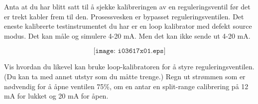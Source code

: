 

Anta at du har blitt satt til å sjekke kalibreringen av en reguleringsventil før det er trekt kabler frem til den. Prosessvesken er bypasset reguleringsventilen. Det eneste kalibrerte testinstrumentet du har er en loop kalibrator med defekt source modus. Det kan måle og simulere 4-20 mA. Men det kan ikke sende ut 4-20 mA.  


$$\texttt{[image: i03617x01.eps]}$$

Vis hvordan du likevel kan bruke loop-kalibratoren for å styre reguleringsventilen. (Du kan ta med annet utstyr som du måtte trenge.) Regn ut strømmen som er nødvendig for å åpne ventilen 75\%, om en antar en split-range calibrering på 12 mA for lukket og 20 mA for åpen. 


\vskip 10pt


\vfil

\eject







